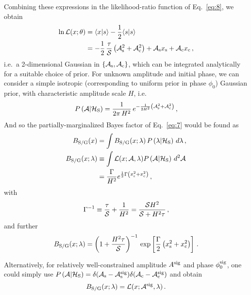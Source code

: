 \documentclass[aps,prd,onecolumn,nofootinbib,superscriptaddress,altaffilletter,floatfix]{revtex4-1}
\begin{document}
Combining these expressions in the likelihood-ratio function of Eq.~\eqref{eq:8}, we obtain
\begin{align}
  \label{eq:21}
  \ln \mathcal{L}(x;\theta) &= \langle x|s\rangle - \frac{1}{2}\langle s|s\rangle\\
  &= -\frac{1}{2}\,\frac{\tau}{\mathcal{S}}\left(\mathcal{A}_{\mathrm{s}}^2+\mathcal{A}_{\mathrm{c}}^2\right) + \mathcal{A}_{\mathrm{s}}x_{\mathrm{s}} + \mathcal{A}_{\mathrm{c}}x_{\mathrm{c}}\,,
\end{align}
i.e.\ a 2-dimensional Gaussian in $\{\mathcal{A}_{\mathrm{s}},\mathcal{A}_{\mathrm{c}}\}$, which can be integrated analytically for a suitable choice of prior.
For unknown amplitude and initial phase, we can consider a simple isotropic (corresponding to uniform prior in phase $\phi_0$) Gaussian prior, with
characteristic amplitude scale $H$, i.e.\
\begin{equation}
  \label{eq:22}
  P\left(\mathcal{A}|\mathcal{H}_{\mathrm{S}}\right) = \frac{1}{2\pi\,H^2}\,e^{-\frac{1}{2H^2}\left(\mathcal{A}_{\mathrm{s}}^2 + \mathcal{A}_{\mathrm{c}}^2\right)}\,,
\end{equation}
And so the partially-marginalized Bayes factor of Eq.~\eqref{eq:7} would be found as
\begin{align}
  \label{eq:23}
  B_{\mathrm{S/G}}(x) &= \int B_{\mathrm{S/G}}(x;\lambda) \,P\left(\lambda|\mathcal{H}_{\mathrm{S}}\right)\,d\lambda\,,\\
  B_{\mathrm{S/G}}(x;\lambda) &\equiv \int \mathcal{L}(x;\mathcal{A},\lambda)P\left(\mathcal{A}|\mathcal{H}_{\mathrm{S}}\right)\,d^2\mathcal{A}\\
  &= \frac{\Gamma}{H^2} e^{\frac{1}{2}\Gamma\left(x_{\mathrm{s}}^2 + x_{\mathrm{c}}^2\right)}\,,
\end{align}
with
\begin{equation}
  \label{eq:25}
  \Gamma^{-1} \equiv \frac{\tau}{\mathcal{S}} + \frac{1}{H^2} = \frac{\mathcal{S} H^2}{\mathcal{S} + H^2\tau}\,,
\end{equation}
and further
\begin{equation}
  \label{eq:26}
  B_{\mathrm{S/G}}(x;\lambda) = \left(1 + \frac{H^2\tau}{\mathcal{S}}\right)^{-1}\,\exp\left[\frac{\Gamma}{2}\left(x_{\mathrm{s}}^2+x_{\mathrm{c}}^2\right)\right]\,.
\end{equation}

Alternatively, for relatively well-constrained amplitude $A^{{\mathrm{sig}}}$ and phase $\phi_0^{\mathrm{sig}}$, one could simply use $P\left(\mathcal{A}|\mathcal{H}_{\mathrm{S}}\right) =
\delta(\mathcal{A}_{\mathrm{s}}-\mathcal{A}_{\mathrm{s}}^{\mathrm{sig}})\delta(\mathcal{A}_{\mathrm{c}}-\mathcal{A}_{\mathrm{c}}^{\mathrm{sig}})$ and obtain
\begin{equation}
  \label{eq:24}
  B_{\mathrm{S/G}}(x;\lambda) = \mathcal{L}(x;\mathcal{A}^{\mathrm{sig}},\lambda)\,.
\end{equation}



\end{document}
